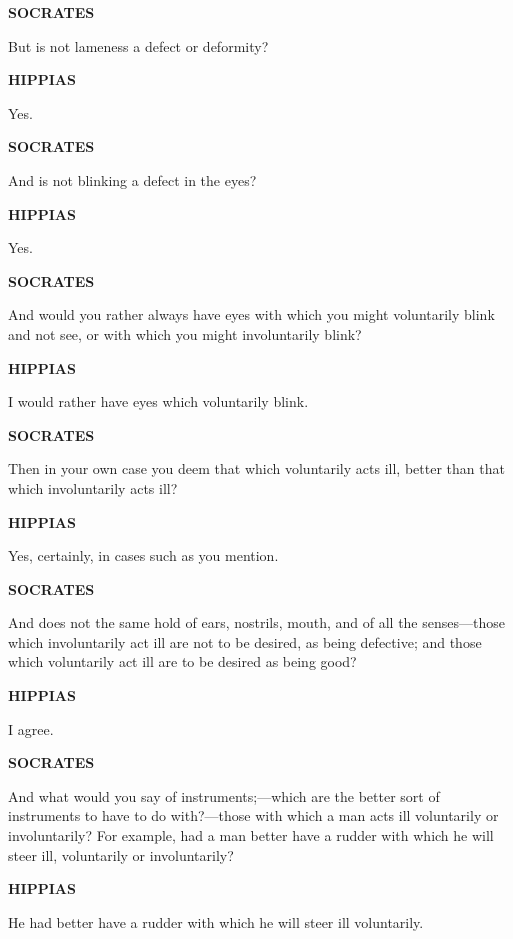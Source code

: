 \documentclass[11pt,letter]{article}
\begin{document}
\par \textbf{SOCRATES}
\par   But is not lameness a defect or deformity?

\par \textbf{HIPPIAS}
\par   Yes.

\par \textbf{SOCRATES}
\par   And is not blinking a defect in the eyes?

\par \textbf{HIPPIAS}
\par   Yes.

\par \textbf{SOCRATES}
\par   And would you rather always have eyes with which you might voluntarily blink and not see, or with which you might involuntarily blink?

\par \textbf{HIPPIAS}
\par   I would rather have eyes which voluntarily blink.

\par \textbf{SOCRATES}
\par   Then in your own case you deem that which voluntarily acts ill, better than that which involuntarily acts ill?

\par \textbf{HIPPIAS}
\par   Yes, certainly, in cases such as you mention.

\par \textbf{SOCRATES}
\par   And does not the same hold of ears, nostrils, mouth, and of all the senses—those which involuntarily act ill are not to be desired, as being defective; and those which voluntarily act ill are to be desired as being good?

\par \textbf{HIPPIAS}
\par   I agree.

\par \textbf{SOCRATES}
\par   And what would you say of instruments;—which are the better sort of instruments to have to do with?—those with which a man acts ill voluntarily or involuntarily? For example, had a man better have a rudder with which he will steer ill, voluntarily or involuntarily?

\par \textbf{HIPPIAS}
\par   He had better have a rudder with which he will steer ill voluntarily.
\end{document}
